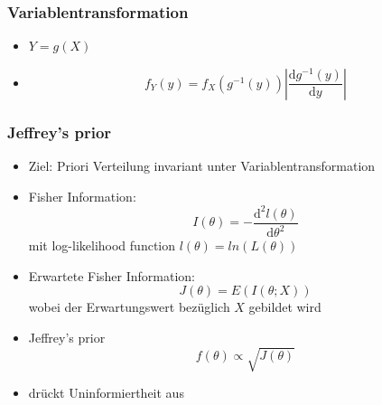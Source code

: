 \documentclass[aspectratio=169,xcolor=dvipsnames]{beamer}
\begin{document}


\begin{frame}
\frametitle{Variablentransformation}
\begin{itemize}
	\item $Y=g(X)$
	\item $$f_Y(y)=f_X(g^{-1}(y))\left|\frac{\text{d}g^{-1}(y)}{\text{d}y}\right|$$
\end{itemize}
\end{frame}

\begin{frame}
\frametitle{Jeffrey's prior}
\begin{itemize}
	\item<1-> Ziel: Priori Verteilung invariant unter Variablentransformation
	\item<2-> Fisher Information: $$I(\theta)=-\frac{\text{d}^2l(\theta)}{\text{d}\theta^2}$$
	mit log-likelihood function $l(\theta)=ln(L(\theta))$
	\item<3-> Erwartete Fisher Information: $$J(\theta)=E(I(\theta;X))$$
	wobei der Erwartungswert bezüglich $X$ gebildet wird
	\item<4-> Jeffrey's prior $$f(\theta)\propto\sqrt{J(\theta)}$$
	\item<5-> drückt Uninformiertheit aus
\end{itemize}
\end{frame}
\end{document}
